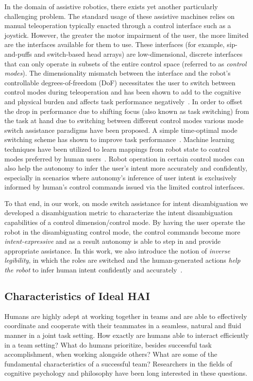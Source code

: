 \documentclass[12pt]{article}
\begin{document}
In the domain of assistive robotics, there exists yet another particularly challenging problem. The standard usage of these assistive machines relies on manual teleoperation typically enacted through a control interface such as a joystick. However, the greater the motor impairment of the user, the more limited are the interfaces available for them to use. These interfaces (for example, sip-and-puffs and switch-based head arrays) are low-dimensional, discrete interfaces that can only operate in subsets of the entire control space (referred to as \textit{control modes}). The dimensionality mismatch between the interface and the robot's controllable degrees-of-freedom (DoF) necessitates the user to switch between control modes during teleoperation and has been shown to add to the cognitive and physical burden and affects task performance negatively~\cite{pilarski2012dynamic}.
In order to offset the drop in performance due to shifting focus (also known as task switching) from the task at hand due to switching between different control modes various mode switch assistance paradigms have been proposed. A simple time-optimal mode switching scheme has shown to improve task performance~\cite{herlant2016assistive}. Machine learning techniques have been utilized to learn mappings from robot state to control modes preferred by human users~\cite{jainrobot}. Robot operation in certain control modes can also help the autonomy to infer the user's intent more accurately and confidently, especially in scenarios where autonomy's inference of user intent is exclusively informed by human's control commands issued via the limited control interfaces. 

To that end, in our work, on mode switch assistance for intent disambiguation we developed a disambiguation metric to characterize the intent disambiguation capabilities of a control dimension/control mode. By having the user operate the robot in the disambiguating control mode, the control commands become more \textit{intent-expressive} and as a result autonomy is able to step in and provide appropriate assistance. In this work, we also introduce the notion of \textit{inverse legibility}, in which the roles are switched and the human-generated actions \textit{help the robot} to infer human intent confidently and accurately~\cite{gopinath2017mode}. 

\subsection{Characteristics of Ideal HAI}
Humans are highly adept at working together in teams and are able to effectively coordinate and cooperate with their teammates in a seamless, natural and fluid manner in a joint task setting. How exactly are humans able to interact efficiently in a team setting?  What do humans prioritize, besides successful task accomplishment, when working alongside others? What are some of the fundamental characteristics of a successful team? Researchers in the fields of cognitive psychology and  philosophy have been long interested in these questions. 
\end{document}
